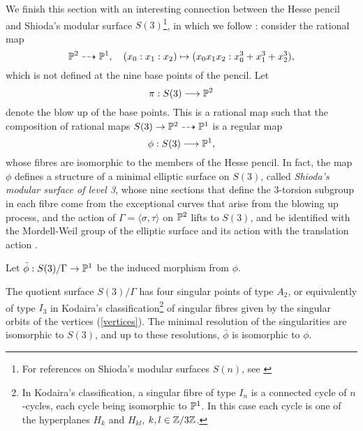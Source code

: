 We finish this section with an interesting connection between the Hesse pencil and Shioda's modular surface $S(3)$\footnote{For references on Shioda's modular surfaces $S(n)$, see \cite{Barth_1985}}, in which we follow \cite{Dolgachev_2006}:
consider the rational map
\begin{equation*}
\mathbb{P}^{2} \dashrightarrow \mathbb{P}^{1},\quad (x_{0}:x_{1}:x_{2}) \mapsto (x_{0}x_{1}x_{2}: x_{0}^{3} + x_{1}^{3} + x_{2}^{3}),
\end{equation*}
which is not defined at the nine base points of the pencil. Let
\begin{equation*}
\pi:S(3) \longrightarrow \mathbb{P}^{2}
\end{equation*}
denote the blow up of the base points. This is a rational map such that the composition of rational maps $S(3) \rightarrow \mathbb{P}^{2} \dashrightarrow \mathbb{P}^{1}$ is a regular map
\begin{equation*}
\phi:S(3) \longrightarrow \mathbb{P}^{1},
\end{equation*}
whose fibres are isomorphic to the members of the Hesse pencil. In fact, the map $\phi$ defines a structure of a minimal elliptic surface on $S(3)$, called \emph{Shioda's modular surface of level 3}, whose nine sections that define the $3$-torsion subgroup in each fibre come from the exceptional curves that arise from the blowing up process, and the action of $\Gamma = \langle \sigma, \tau \rangle$ on $\mathbb{P}^{2}$ lifts to $S(3)$, and be identified with the Mordell-Weil group of the elliptic surface and its action with the translation action \cite{Dolgachev_2006}.

Let $\bar{\phi}:S(3)/\Gamma \rightarrow \mathbb{P}^{1}$ be the induced morphism from $\phi$.\\

\begin{prop}
	\label{shioda}
	The quotient surface $S(3)/\Gamma$ has four singular points of type $A_{2}$, or equivalently of type $I_{3}$ in Kodaira's classification\footnote{In Kodaira's classification, a singular fibre of type $I_{n}$ is a connected cycle of $n$-cycles, each cycle being isomorphic to $\mathbb{P}^{1}$. In this case each cycle is one of the hyperplanes $H_{k}$ and $H_{kl}$, $k,l\in\mathbb{Z}/3\mathbb{Z}$.} of singular fibres \cite{Kodaira_1963} given by the singular orbits of the vertices (\ref{vertices}). The minimal resolution of the singularities are isomorphic to $S(3)$, and up to these resolutions, $\bar{\phi}$ is isomorphic to $\phi$.
\end{prop}

